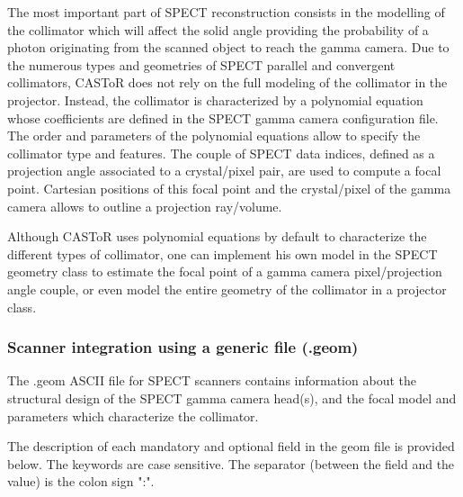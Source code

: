 \documentclass[a4paper, 11pt]{article}
\begin{document}
The most important part of SPECT reconstruction consists in the modelling of the collimator which will affect the solid angle providing the probability
of a photon originating from the scanned object to reach the gamma camera. Due to the numerous types and geometries of SPECT parallel and convergent
collimators, CASToR does not rely on the full modeling of the collimator in the projector. Instead, the collimator is characterized by a polynomial
equation whose coefficients are defined in the SPECT gamma camera configuration file. The order and parameters of the polynomial equations allow to
specify the collimator type and features. The couple of SPECT data indices, defined as a projection angle associated to a crystal/pixel pair, are used
to compute a focal point. Cartesian positions of this focal point and the crystal/pixel of the gamma camera allows to outline a projection ray/volume.

Although CASToR uses polynomial equations by default to characterize the different types of collimator, one can implement his own model in the SPECT
geometry class to estimate the focal point of a gamma camera pixel/projection angle couple, or even model the entire geometry of the collimator in a
projector class.

\subsubsection{Scanner integration using a generic file (.geom)}
\label{sss_SPECT_conv_geom}

The .geom ASCII file for SPECT scanners contains information about the structural design of the SPECT gamma camera head(s), and the focal model and
parameters which characterize the collimator.

The description of each mandatory and optional field in the geom file is provided below. The keywords are case sensitive.
The separator (between the field and the value) is the colon sign ":".\\
\end{document}
